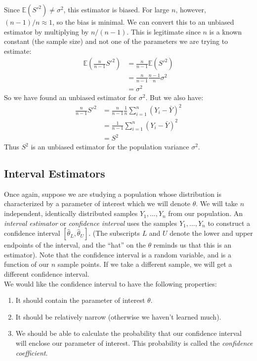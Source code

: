\documentclass[12pt]{article}
\theoremstyle{definition}
\theoremstyle{remark}
\def\E{{\mathbb E}}
\begin{document}
Since $\E(S'^2) \neq \sigma^2$, this estimator is biased. For large $n$, however, $(n-1)/n \approx 1$, so the bias is minimal. We can convert this to an unbiased estimator by multiplying by $n / (n-1)$. This is legitimate since $n$ is a known constant (the sample size) and not one of the parameters we are trying to estimate:
\begin{align*}
\E\left( \frac{n}{n-1} S'^2 \right) &= \frac{n}{n-1} \E(S'^2) \\
&= \frac{n}{n-1} \frac{n-1}{n} \sigma^2 \\
&= \sigma^2
\end{align*}
So we have found an unbiased estimator for $\sigma^2$. But we also have:
\begin{align*}
\frac{n}{n-1} S'^2 &= \frac{n}{n-1} \frac{1}{n} \sum_{i=1}^n (Y_i - \bar{Y})^2 \\
&= \frac{1}{n-1} \sum_{i=1}^n (Y_i - \bar{Y})^2 \\
&= S^2
\end{align*}
Thus $S^2$ is an unbiased estimator for the population variance $\sigma^2$.

\subsection{Interval Estimators}
Once again, suppose we are studying a population whose distribution is characterized by a parameter of interest which we will denote $\theta$. We will take $n$ independent, identically distributed samples $Y_1, \dots, Y_n$ from our population. An \emph{interval estimator} or \emph{confidence interval} uses the samples $Y_1, \dots, Y_n$ to construct a confidence interval $[\hat{\theta}_L, \hat{\theta}_U]$. (The subscripts $L$ and $U$ denote the lower and upper endpoints of the interval, and the ``hat'' on the $\theta$ reminds us that this is an estimator). Note that the confidence interval is a random variable, and is a function of our $n$ sample points. If we take a different sample, we will get a different confidence interval.\\

We would like the confidence interval to have the following properties:
\begin{enumerate}
\item It should contain the parameter of interest $\theta$.
\item It should be relatively narrow (otherwise we haven't learned much).
\item We should be able to calculate the probability that our confidence interval will enclose our parameter of interest. This probability is called the \emph{confidence coefficient}.
\end{enumerate}
\end{document}
